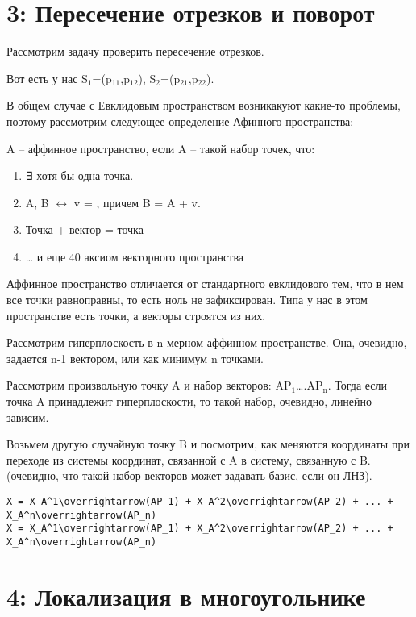 \documentclass[11pt]{article}
\begin{document}
\section{{\bfseries{}} 3:  Пересечение отрезков и поворот}
\label{sec-4}
Рассмотрим задачу проверить пересечение отрезков.

Вот есть у нас S$_{\text{1}}$=(p$_{\text{11}}$,p$_{\text{12}}$), S$_{\text{2}}$=(p$_{\text{21}}$,p$_{\text{22}}$).

В общем случае с Евклидовым пространством возникакуют какие-то
проблемы, поэтому рассмотрим следующее определение Афинного
пространства:

A -- аффинное пространство, если A -- такой набор точек, что:
\begin{enumerate}
\item ∃ хотя бы одна точка.
\item A, B $\leftrightarrow$ v = , причем B = A + v.
\item Точка + вектор = точка
\item \ldots{} и еще 40 аксиом векторного пространства
\end{enumerate}

Аффинное пространство отличается от стандартного евклидового тем,
что в нем все точки равноправны, то есть ноль не зафиксирован. Типа
у нас в этом пространстве есть точки, а векторы строятся из них.

Рассмотрим гиперплоскость в n-мерном аффинном пространстве. Она,
очевидно, задается n-1 вектором, или как минимум n точками.

Рассмотрим произвольную точку A и набор векторов: AP$_{\text{1}}$\ldots{}.AP$_{\text{n}}$. Тогда
если точка A принадлежит гиперплоскости, то такой набор, очевидно,
линейно зависим.

Возьмем другую случайную точку B и посмотрим, как меняются
координаты при переходе из системы координат, связанной с A в
систему, связанную с B. (очевидно, что такой набор векторов может
задавать базис, если он ЛНЗ).

\lstset{language=[LaTeX]TeX,label= ,caption= ,numbers=none}
\begin{lstlisting}
X = X_A^1\overrightarrow(AP_1) + X_A^2\overrightarrow(AP_2) + ... + X_A^n\overrightarrow(AP_n)
X = X_A^1\overrightarrow(AP_1) + X_A^2\overrightarrow(AP_2) + ... + X_A^n\overrightarrow(AP_n)
\end{lstlisting}
\section{{\bfseries{}} 4:  Локализация в многоугольнике}
\label{sec-5}
\end{document}
